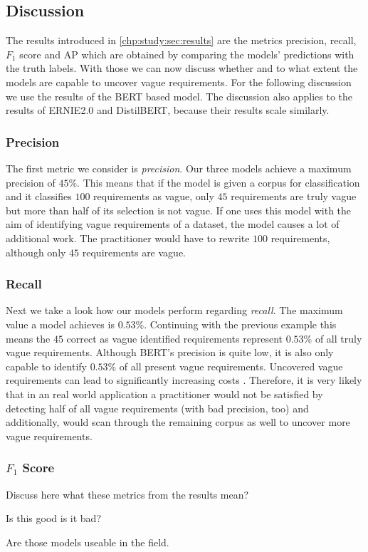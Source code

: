 \subsection{Discussion}
\label{chp:study:sec:interpretation:subsec:discussion}

The results introduced in \cref{chp:study:sec:results} are the metrics precision, recall, $F_1$ score and \ac{AP} which are obtained by comparing the models' predictions with the truth labels.
With those we can now discuss whether and to what extent the models are capable to uncover vague requirements.
For the following discussion we use the results of the \ac{BERT} based model.
The discussion also applies to the results of \ac{ERNIE2.0} and \ac{DistilBERT}, because their results scale similarly.

\subsubsection{Precision}
\label{chp:study:sec:interpretation:subsec:discussion:precision}
The first metric we consider is \textit{precision}.
Our three models achieve a maximum precision of $45\%$.
This means that if the model is given a corpus for classification and it classifies $100$ requirements as vague, only $45$ requirements are truly vague but more than half of its selection is not vague.
If one uses this model with the aim of identifying vague requirements of a dataset, the model causes a lot of additional work.
The practitioner would have to rewrite $100$ requirements, although only $45$ requirements are vague.

\subsubsection{Recall}
\label{chp:study:sec:interpretation:subsec:discussion:recall}
Next we take a look how our models perform regarding \textit{recall}.
The maximum value a model achieves is $0.53\%$.
Continuing with the previous example this means the $45$ correct as vague identified requirements represent $0.53\%$ of all truly vague requirements.
Although \ac{BERT}'s precision is quite low, it is also only capable to identify $0.53\%$ of all present vague requirements.
Uncovered vague requirements can lead to significantly increasing costs \parencite{Femmer:2017}.
Therefore, it is very likely that in an real world application a practitioner would not be satisfied by detecting half of all vague requirements (with bad precision, too) and additionally, would scan through the remaining corpus as well to uncover more vague requirements.

\subsubsection{$F_1$ Score}
\label{chp:study:sec:interpretation:subsec:discussion:recall:f1_score}


Discuss here what these metrics from the results mean?

Is this good is it bad?

Are those models useable in the field.
